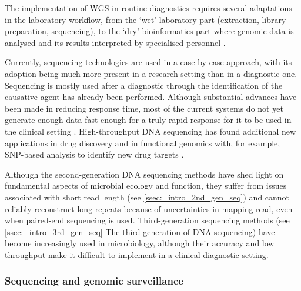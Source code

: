 The implementation of \ac{WGS} in routine diagnostics requires several adaptations in the laboratory workflow, from the ‘wet’ laboratory part (extraction, library preparation, sequencing), to the ‘dry’ bioinformatics part where genomic data is analysed and its results interpreted by specialised personnel \citep{rossen_practical_2018}. 

Currently, sequencing technologies are used in a case-by-case approach, with its adoption being much more present in a research setting than in a diagnostic one. 
Sequencing is mostly used after a diagnostic through the identification of the causative agent has already been performed. 
Although substantial advances have been made in reducing response time, most of the current systems do not yet generate enough data fast enough for a truly rapid response for it to be used in the clinical setting \citep{goodwin_coming_2016}. 
High-throughput DNA sequencing has found additional new applications in drug discovery and in functional genomics with, for example, SNP-based analysis to identify new drug targets \citep{loman_twenty_2015}.

Although the second-generation DNA sequencing methods have shed light on fundamental aspects of microbial ecology and function, they suffer from issues associated with short read length (see \ref{ssec:_intro_2nd_gen_seq}) and cannot reliably reconstruct long repeats because of uncertainties in mapping read, even when paired-end sequencing is used. 
Third-generation sequencing methods (see \ref{ssec:_intro_3rd_gen_seq} The third-generation of DNA sequencing) have become increasingly used in microbiology, although their accuracy and low throughput make it difficult to implement in a clinical diagnostic setting. 

\subsubsection{Sequencing and genomic surveillance} \label{sssec:_intro_sequencing_genomic_survaillance}

